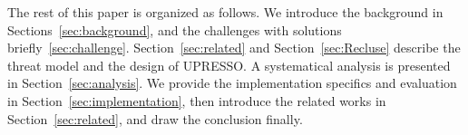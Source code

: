 The rest of this paper is organized as follows. We introduce the background in Sections~\ref{sec:background}, and the challenges with solutions briefly~\ref{sec:challenge}. Section~\ref{sec:related} and Section~\ref{sec:Recluse} describe the threat model and the design of UPRESSO. A systematical analysis is presented in Section~\ref{sec:analysis}. We provide the implementation specifics and evaluation in Section~\ref{sec:implementation}, then introduce the related works in Section~\ref{sec:related}, and draw the conclusion finally.




